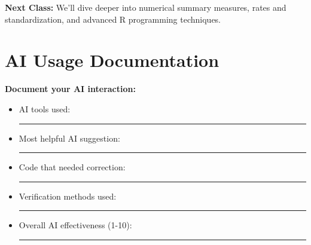 \documentclass[11pt]{article}
\begin{document}
\textbf{Next Class:} We'll dive deeper into numerical summary measures, rates and standardization, and advanced R programming techniques.

\section{AI Usage Documentation}
\begin{tcolorbox}[colback=gray!10,colframe=gray,boxrule=1pt,arc=2pt,left=6pt,right=6pt,top=6pt,bottom=6pt]
\textbf{Document your AI interaction:}
\begin{itemize}
\item AI tools used: \rule{8cm}{0.4pt}
\item Most helpful AI suggestion: \rule{8cm}{0.4pt}
\item Code that needed correction: \rule{8cm}{0.4pt}
\item Verification methods used: \rule{8cm}{0.4pt}
\item Overall AI effectiveness (1-10): \rule{2cm}{0.4pt}
\end{itemize}
\end{tcolorbox}
\end{document}

